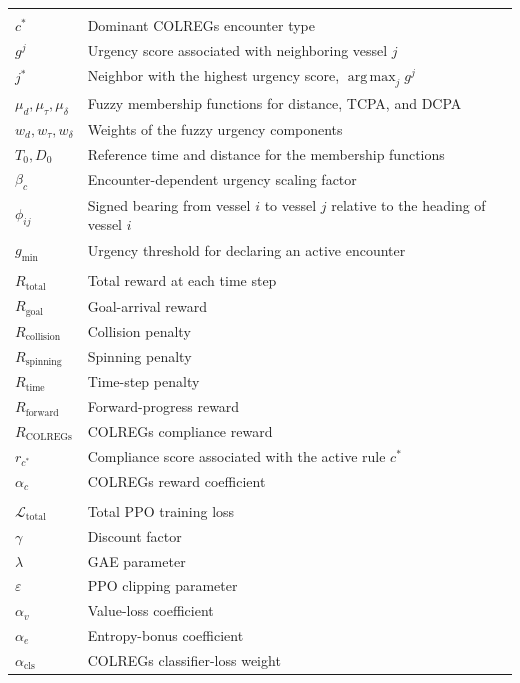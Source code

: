 \documentclass[final,5p,times,twocolumn]{elsarticle}
\begin{document}
{\begin{table}[t]
\begin{tabularx}{\textwidth}{
    >{\centering\arraybackslash}p{}
    >{\raggedright\arraybackslash}X}
\addlinespace
\multicolumn{2}{l}{\textit{COLREGs Assessment}} \\
$c^*$ 
& Dominant COLREGs encounter type \\
$g^j$ 
& Urgency score associated with neighboring vessel $j$ \\
$j^*$ 
& Neighbor with the highest urgency score, $\operatorname*{arg\,max}_{j} g^j$ \\
$\mu_d,\mu_\tau,\mu_\delta$ 
& Fuzzy membership functions for distance, TCPA, and DCPA \\
$w_d,w_\tau,w_\delta$ 
& Weights of the fuzzy urgency components \\
$T_0,D_0$ 
& Reference time and distance for the membership functions \\
$\beta_c$ 
& Encounter-dependent urgency scaling factor \\
$\phi_{ij}$ 
& Signed bearing from vessel $i$ to vessel $j$ relative to the heading of vessel $i$ \\
$g_{\min}$ 
& Urgency threshold for declaring an active encounter \\

\addlinespace
\multicolumn{2}{l}{\textit{Reward}} \\
$R_{\mathrm{total}}$ 
& Total reward at each time step \\
$R_{\mathrm{goal}}$ 
& Goal-arrival reward \\
$R_{\mathrm{collision}}$ 
& Collision penalty \\
$R_{\mathrm{spinning}}$ 
& Spinning penalty \\
$R_{\mathrm{time}}$ 
& Time-step penalty \\
$R_{\mathrm{forward}}$ 
& Forward-progress reward \\
$R_{\mathrm{COLREGs}}$ 
& COLREGs compliance reward \\
$r_{c^*}$ 
& Compliance score associated with the active rule $c^*$ \\
$\alpha_c$ 
& COLREGs reward coefficient \\

\addlinespace
\multicolumn{2}{l}{\textit{Training}} \\
$\mathcal{L}_{\mathrm{total}}$ 
& Total PPO training loss \\
$\gamma$ 
& Discount factor \\
$\lambda$ 
& GAE parameter \\
$\varepsilon$ 
& PPO clipping parameter \\
$\alpha_v$ 
& Value-loss coefficient \\
$\alpha_e$ 
& Entropy-bonus coefficient \\
$\alpha_{\mathrm{cls}}$ 
& COLREGs classifier-loss weight \\


\end{tabularx}
\end{table}}
\end{document}
